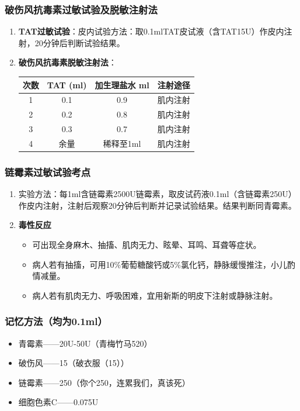 \documentclass[11pt, a4paper]{ctexart}
\begin{document}
\subsubsection{破伤风抗毒素过敏试验及脱敏注射法}
\begin{enumerate}
    \item \textbf{TAT过敏试验}：皮内试验方法：取0.1mlTAT皮试液（含TAT15U）作皮内注射，20分钟后判断试验结果。
    \item \textbf{破伤风抗毒素脱敏注射法}：
    \begin{table}[htbp]
    \centering
    \begin{tabular}{|c|c|c|c|}
    \hline
    \textbf{次数} & \textbf{TAT (ml)} & \textbf{加生理盐水 ml} & \textbf{注射途径} \\
    \hline
    1 & 0.1 & 0.9 & 肌内注射 \\
    2 & 0.2 & 0.8 & 肌内注射 \\
    3 & 0.3 & 0.7 & 肌内注射 \\
    4 & 余量 & 稀释至1ml & 肌内注射 \\
    \hline
    \end{tabular}
    \end{table}
\end{enumerate}

\subsubsection{链霉素过敏试验考点}
\begin{enumerate}
    \item 实验方法：每1ml含链霉素2500U链霉素，取皮试药液0.1ml（含链霉素250U）作皮内注射，注射后观察20分钟后判断并记录试验结果。结果判断同青霉素。
    \item \textbf{毒性反应}
    \begin{itemize}
        \item 可出现全身麻木、抽搐、肌肉无力、眩晕、耳鸣、耳聋等症状。
        \item 病人若有抽搐，可用10\%葡萄糖酸钙或5\%氯化钙，静脉缓慢推注，小儿酌情减量。
        \item 病人若有肌肉无力、呼吸困难，宜用新斯的明皮下注射或静脉注射。
    \end{itemize}
\end{enumerate}

\subsubsection{记忆方法（均为0.1ml）}
\begin{itemize}
    \item 青霉素——20U-50U（青梅竹马520）
    \item 破伤风——15（破衣服（15））
    \item 链霉素——250（你个250，连累我们，真该死）
    \item 细胞色素C——0.075U
\end{itemize}
\end{document}
